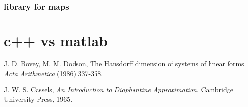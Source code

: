 \documentclass[reqno,openany,12pt]{amsbook}
\theoremstyle{definition}
\theoremstyle{remark}
\begin{document}
\subsection{library for maps}
\chapter{c++ vs matlab}




\begin{thebibliography}{99}

J. D. Bovey, M. M. Dodson,
The Hausdorff dimension of systems of linear forms
{\em Acta Arithmetica}
(1986) 337-358.

J. W. S. Cassels,
{\em An Introduction to Diophantine Approximation},
Cambridge University Press, 1965.



\end{thebibliography}
\end{document}
